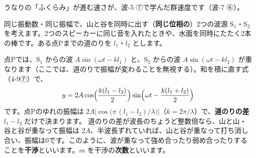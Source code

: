 \noindent うなりの「ふくらみ」が進む速さが、波-5 ⑦で学んだ群速度です（波-7 ⑥）。

\label{ph:波-8:sec3}
同じ振動数・同じ振幅で、山と谷を同時に出す（\textbf{同じ位相の}）2つの波源 S$_1$・S$_2$ を考えます。2つのスピーカーに同じ音を入れたときや、水面を同時にたたく2本の棒です。ある点Pまでの道のりを $l_1$・$l_2$ とします。

点Pでは、S$_1$ からの波 $A\sin(\omega t-kl_1)$ と、S$_2$ からの波 $A\sin(\omega t-kl_2)$ が重なります（ここでは、道のりで振幅が変わることを無視する）。和を積に直す式（4-9⑦）で、
\[y=2A\cos\Bigl(\frac{k(l_1-l_2)}{2}\Bigr)\sin\Bigl(\omega t-\frac{k(l_1+l_2)}{2}\Bigr)\]
です。点Pのゆれの振幅は $2A\bigl|\cos\bigl(\pi\,(l_1-l_2)/\lambda\bigr)\bigr|$（$k=2\pi/\lambda$）で、\textbf{道のりの差} $l_1-l_2$ だけで決まります。
\label{ph:波-8:kanshou}道のりの差が波長のちょうど整数倍なら、山と山・谷と谷が重なって振幅は $2A$、半波長ずれていれば、山と谷が重なって打ち消し合い、振幅は0です。このように、波が重なって強め合ったり弱め合ったりすることを\textbf{干渉}といいます。$m$ を干渉の\textbf{次数}といいます。

